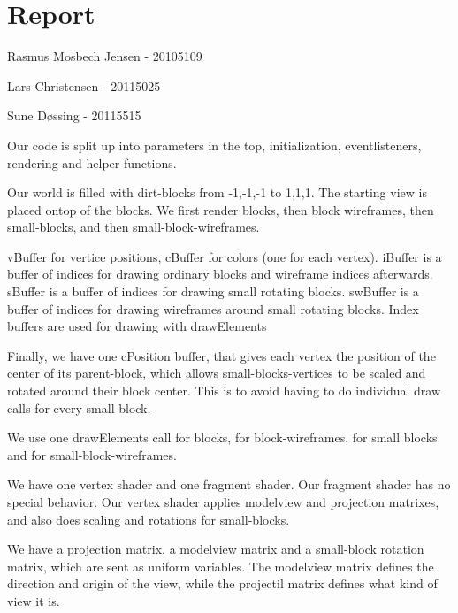 \section{Report}

Rasmus Mosbech Jensen - 20105109

Lars Christensen - 20115025

Sune D\o ssing - 20115515 


Our code is split up into parameters in the 
top, initialization, eventlisteners, rendering and helper functions.

Our world is filled with dirt-blocks from -1,-1,-1 to 1,1,1.
The starting view is placed ontop of the blocks.
We first render blocks, then block wireframes, then small-blocks, and then small-block-wireframes.


vBuffer for vertice positions, cBuffer for colors (one for each vertex).
iBuffer is a buffer of indices for drawing ordinary blocks and wireframe indices afterwards.
sBuffer is a buffer of indices for drawing small rotating blocks.
swBuffer is a buffer of indices for drawing wireframes around small rotating blocks.
Index buffers are used for drawing with drawElements

Finally, we have one cPosition buffer, 
that gives each vertex the position of the center of its parent-block, 
which allows small-blocks-vertices to be scaled and rotated around their block center.
This is to avoid having to do individual draw calls for every small block.


We use one drawElements call for blocks, for block-wireframes, for small blocks and for small-block-wireframes.


We have one vertex shader and one fragment shader. Our fragment shader has no special behavior.
Our vertex shader applies modelview and projection matrixes, and also does scaling and rotations for small-blocks.


We have a projection matrix, a modelview matrix and a small-block rotation matrix, which are sent as uniform variables.
The modelview matrix defines the direction and origin of the view, while the projectil matrix defines what kind of view it is.

